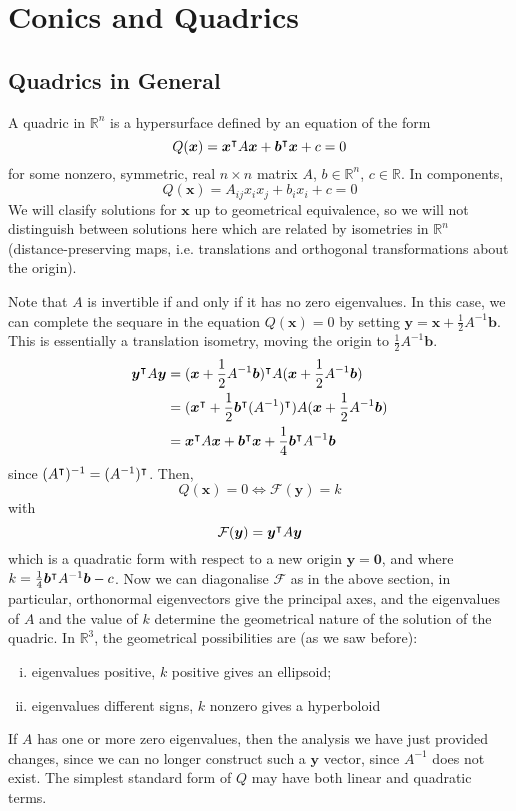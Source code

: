 \documentclass{article}
\begin{document}
\section{Conics and Quadrics}
\subsection{Quadrics in General}
A quadric in $\mathbb R^n$ is a hypersurface defined by an equation of the form
\[ Q(\bm x) = \bm x^\intercal A \bm x + \bm b^\intercal \bm x + c = 0 \]
for some nonzero, symmetric, real $n \times n$ matrix $A$, $b \in \mathbb R^n$, $c \in \mathbb R$. In components,
\[ Q(\bm x) = A_{ij}x_ix_j + b_ix_i + c = 0 \]
We will clasify solutions for $\bm x$ up to geometrical equivalence, so we will not distinguish between solutions here which are related by isometries in $\mathbb R^n$ (distance-preserving maps, i.e. translations and orthogonal transformations about the origin).

Note that $A$ is invertible if and only if it has no zero eigenvalues. In this case, we can complete the sequare in the equation $Q(\bm x) = 0$ by setting $\bm y = \bm x + \frac{1}{2}A^{-1} \bm b$. This is essentially a translation isometry, moving the origin to $\frac{1}{2}A^{-1} \bm b$.
\begin{align*}
	\bm y^\intercal A \bm y & = (\bm x + \frac{1}{2}A^{-1}\bm b)^\intercal A (\bm x + \frac{1}{2}A^{-1}\bm b)                         \\
	                         & = (\bm x^\intercal + \frac{1}{2}\bm b^\intercal(A^{-1})^\intercal) A (\bm x + \frac{1}{2}A^{-1}\bm b) \\
	                         & = \bm x^\intercal A \bm x + \bm b^\intercal \bm x + \frac{1}{4}\bm b^\intercal A^{-1}\bm b
\end{align*}
since $(A^\intercal)^{-1} = (A^{-1})^\intercal$. Then,
\[ Q(\bm x) = 0 \iff \mathcal F(\bm y) = k \]
with
\[ \mathcal F(\bm y) = \bm y^\intercal A \bm y \]
which is a quadratic form with respect to a new origin $\bm y = \bm 0$, and where $k = \frac{1}{4}\bm b^\intercal A^{-1}\bm b - c$. Now we can diagonalise $\mathcal F$ as in the above section, in particular, orthonormal eigenvectors give the principal axes, and the eigenvalues of $A$ and the value of $k$ determine the geometrical nature of the solution of the quadric. In $\mathbb R^3$, the geometrical possibilities are (as we saw before):
\begin{enumerate}[(i)]
	\item eigenvalues positive, $k$ positive gives an ellipsoid;
	\item eigenvalues different signs, $k$ nonzero gives a hyperboloid
\end{enumerate}
If $A$ has one or more zero eigenvalues, then the analysis we have just provided changes, since we can no longer construct such a $\bm y$ vector, since $A^{-1}$ does not exist. The simplest standard form of $Q$ may have both linear and quadratic terms.
\end{document}
